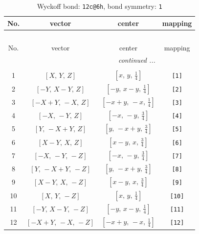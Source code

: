 \documentclass[fleqn,8pt]{jsarticle}
\begin{document}
\begin{longtable}{cccc}
\caption{Wyckoff bond: {\tt 12c@6h}, bond symmetry: {\tt 1}}
 \\
 \hline \hline
No. & vector & center & mapping \\ \hline \endfirsthead

\multicolumn{3}{l}{\tablename\ \thetable{}} \\
 \hline \hline
No. & vector & center & mapping \\ \hline \endhead

 \hline \hline
\multicolumn{3}{r}{\footnotesize\it continued ...} \\ \endfoot

 \hline \hline
\multicolumn{3}{r}{} \\ \endlastfoot

1 & $\left[ X,\, Y,\, Z \right]$ & $\left[ x,\, y,\, \frac{1}{4} \right]$ & {\tt [1]} \\ \hline
2 & $\left[ - Y,\, X - Y,\, Z \right]$ & $\left[ - y,\, x - y,\, \frac{1}{4} \right]$ & {\tt [2]} \\ \hline
3 & $\left[ - X + Y,\, - X,\, Z \right]$ & $\left[ - x + y,\, - x,\, \frac{1}{4} \right]$ & {\tt [3]} \\ \hline
4 & $\left[ - X,\, - Y,\, Z \right]$ & $\left[ - x,\, - y,\, \frac{3}{4} \right]$ & {\tt [4]} \\ \hline
5 & $\left[ Y,\, - X + Y,\, Z \right]$ & $\left[ y,\, - x + y,\, \frac{3}{4} \right]$ & {\tt [5]} \\ \hline
6 & $\left[ X - Y,\, X,\, Z \right]$ & $\left[ x - y,\, x,\, \frac{3}{4} \right]$ & {\tt [6]} \\ \hline
7 & $\left[ - X,\, - Y,\, - Z \right]$ & $\left[ - x,\, - y,\, \frac{3}{4} \right]$ & {\tt [7]} \\ \hline
8 & $\left[ Y,\, - X + Y,\, - Z \right]$ & $\left[ y,\, - x + y,\, \frac{3}{4} \right]$ & {\tt [8]} \\ \hline
9 & $\left[ X - Y,\, X,\, - Z \right]$ & $\left[ x - y,\, x,\, \frac{3}{4} \right]$ & {\tt [9]} \\ \hline
10 & $\left[ X,\, Y,\, - Z \right]$ & $\left[ x,\, y,\, \frac{1}{4} \right]$ & {\tt [10]} \\ \hline
11 & $\left[ - Y,\, X - Y,\, - Z \right]$ & $\left[ - y,\, x - y,\, \frac{1}{4} \right]$ & {\tt [11]} \\ \hline
12 & $\left[ - X + Y,\, - X,\, - Z \right]$ & $\left[ - x + y,\, - x,\, \frac{1}{4} \right]$ & {\tt [12]} \\
\end{longtable}
\end{document}
